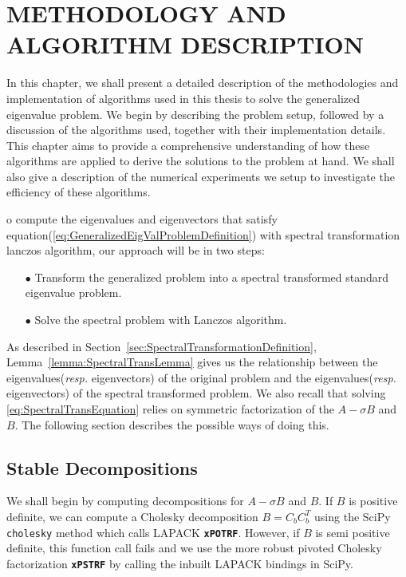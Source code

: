 \chapter{METHODOLOGY AND ALGORITHM DESCRIPTION}

In this chapter, we shall present a detailed description of the methodologies and implementation of algorithms used in this thesis to solve the generalized eigenvalue problem. We begin by describing the problem setup, followed by a discussion of the algorithms used, together with their implementation details. This chapter aims to provide a comprehensive understanding of how these algorithms are applied to derive the solutions to the problem at hand. We shall also give a description of the numerical experiments we setup to investigate the efficiency of these algorithms.

o compute the eigenvalues and eigenvectors that satisfy equation(\ref{eq:GeneralizedEigValProblemDefinition}) with spectral transformation lanczos algorithm, our approach will be in two steps:
\begin{itemize}
	\item[$\bullet$] Transform the generalized problem into a spectral transformed standard eigenvalue problem.
	\item[$\bullet$] Solve the spectral problem with Lanczos algorithm.
\end{itemize}
As described in Section~\ref{sec:SpectralTransformationDefinition}, 
Lemma~\ref{lemma:SpectralTransLemma} gives us the relationship between the eigenvalues(\textit{resp.} eigenvectors) of the original problem and the eigenvalues(\textit{resp.} eigenvectors) of the spectral transformed problem. We also recall that solving \ref{eq:SpectralTransEquation} relies on symmetric factorization of the $A - \sigma B$ and $B$. The following section describes the possible ways of doing this.
\section{Stable Decompositions}
We shall begin by computing decompositions for $A - \sigma B$ and $B$. If $B$ is positive  definite, we can compute a Cholesky decomposition $B = C_bC_b^T$ using the SciPy \texttt{cholesky} method which calls LAPACK \textbf{\texttt{xPOTRF}}. However, if $B$ is semi positive definite, this function call fails and we use the more robust pivoted Cholesky factorization \textbf{\texttt{xPSTRF}} by calling the inbuilt LAPACK bindings in SciPy.

